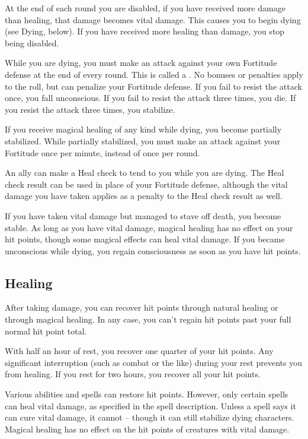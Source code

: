         At the end of each round you are disabled, if you have received more damage than healing, that damage becomes vital damage.
        This causes you to begin dying (see Dying, below).
        If you have received more healing than damage, you stop being disabled.

        \label{Dying} While you are dying, you must make an attack against your own Fortitude defense at the end of every round.
        This is called a .
        No bonuses or penalties apply to the roll, but  can penalize your Fortitude defense.
        If you fail to resist the attack once, you fall unconscious.
        If you fail to resist the attack three times, you die.
        If you resist the attack three times, you stabilize.

        If you receive magical healing of any kind while dying, you become partially stabilized.
        While partially stabilized, you must make an attack against your Fortitude once per minute, instead of once per round.

        An ally can make a Heal check to tend to you while you are dying.
        The Heal check result can be used in place of your Fortitude defense, although the vital damage you have taken applies as a penalty to the Heal check result as well.

        \label{Stable}
        If you have taken vital damage but managed to stave off death, you become stable.
        As long as you have vital damage, magical healing has no effect on your hit points, though some magical effects can heal vital damage.
        If you became unconscious while dying, you regain consciousness as soon as you have hit points.

    \subsection{Healing}
        After taking damage, you can recover hit points through natural healing or through magical healing.
        In any case, you can't regain hit points past your full normal hit point total.

         With half an hour of rest, you recover one quarter of your hit points.
        Any significant interruption (such as combat or the like) during your rest prevents you from healing.
        If you rest for two hours, you recover all your hit points.

         Various abilities and spells can restore hit points.
        However, only certain spells can heal vital damage, as specified in the spell description.
        Unless a spell says it can cure vital damage, it cannot -- though it can still stabilize dying characters.
        Magical healing has no effect on the hit points of creatures with vital damage.

